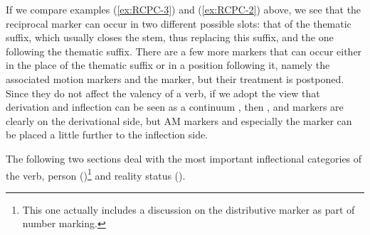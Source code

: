 If we compare examples (\ref{ex:RCPC-3}) and (\ref{ex:RCPC-2}) above, we see that the reciprocal marker can occur in two different possible slots: that of the thematic suffix, which usually closes the stem, thus replacing this suffix, and the one following the thematic suffix. There are a few more markers that can occur either in the place of the thematic suffix or in a position following it, namely the associated motion markers and the  marker, but their treatment is postponed. Since they do not affect the valency of a verb, if we adopt the view that derivation and inflection can be seen as a continuum \citep[cf.][261]{Croft2000}, then ,  and  markers are clearly on the derivational side, but AM markers and especially the  marker can be placed a little further to the inflection side.


The following two sections deal with the most important inflectional categories of the verb, person ()\footnote{This one actually includes a discussion on the distributive marker as part of number marking.} and reality status ().


%
%
%
%
%
%
%
%
%
%
%
%


